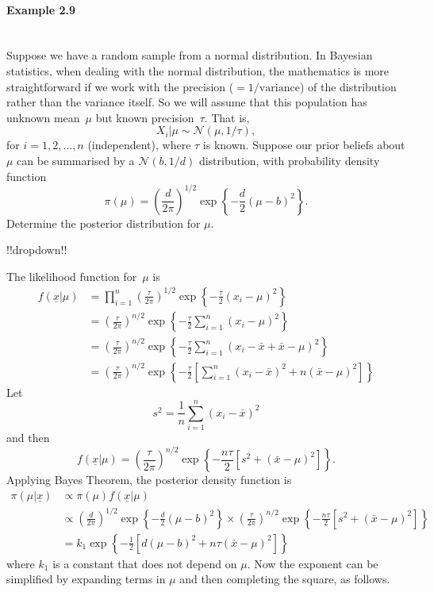 \paragraph{Example 2.9}{\label{ex:normal}~\\
Suppose we have a random sample from a normal distribution. In Bayesian statistics, when dealing with the normal distribution, the mathematics is more straightforward if we work with the precision ($=1/\mathrm{variance}$) of the distribution rather than the variance itself. So we will assume that this population has unknown mean~$\mu$ but known precision~$\tau$. That is, 
$$X_i|\mu\sim \mathcal{N}(\mu,1/\tau),$$
for $i=1,2,\ldots,n$ (independent), where $\tau$ is known. Suppose our prior beliefs about $\mu$ can be summarised by a $\mathcal{N}(b,1/d)$ distribution, with probability density function
\begin{equation}
\label{eq:p11}
\pi(\mu)=
\left(\frac{d}{2\pi}\right)^{1/2}\exp\left\{-\frac{d}{2}(\mu-b)^2\right\}.
\end{equation}
Determine the posterior distribution for $\mu$. 





!!dropdown!!

The likelihood function for~$\mu$ is
        \begin{align*}
        f(\underline{x}|\mu)&=\prod_{i=1}^n 
        \left(\frac{\tau}{2\pi}\right)^{1/2}
        \exp\left\{-\frac{\tau}{2}(x_i-\mu)^2\right\}  \\
        &= \left(\frac{\tau}{2\pi}\right)^{n/2}
        \exp\left\{-\frac{\tau}{2}\sum_{i=1}^n (x_i-\mu)^2\right\} \\
        &= \left(\frac{\tau}{2\pi}\right)^{n/2}
        \exp\left\{-\frac{\tau}{2}\sum_{i=1}^n (x_i-\bar x+\bar x-\mu)^2\right\} \\
        &= \left(\frac{\tau}{2\pi}\right)^{n/2}
        \exp\left\{-\frac{\tau}{2}\left[\sum_{i=1}^n (x_i-\bar x)^2+n(\bar x-\mu)^2\right]\right\} 
        \end{align*}
        Let
        $$s^2 =\frac{1}{n}\sum_{i=1}^n (x_i-\bar x)^2$$
        and then
        \begin{equation}
        f(\underline{x} | \mu) = \left(\frac{\tau}{2\pi}\right)^{n/2}
        \exp\left\{-\frac{n\tau}{2}\left[s^2+(\bar x-\mu)^2\right]\right\}. \label{eq:p10}
        \end{equation}
        Applying Bayes Theorem, the posterior density function is
        \begin{align*}
        \pi(\mu|\underline{x})&\propto\pi(\mu)f(\underline{x} | \mu)\\
        &\propto \left(\frac{d}{2\pi}\right)^{1/2}\exp\left\{-\frac{d}{2}(\mu-b)^2\right\} \times \left(\frac{\tau}{2\pi}\right)^{n/2}
        \exp\left\{-\frac{n\tau}{2}\left[s^2+(\bar x-\mu)^2\right]\right\} \\
        &=k_1\exp\left\{-\frac{1}{2}\left[d(\mu-b)^2+n\tau(\bar x-\mu)^2\right]\right\}
        \end{align*}
        where $k_1$ is a constant that does not depend on $\mu$. Now the
        exponent can be simplified by expanding terms in $\mu$ and then
        completing the square, as follows.
        
}
